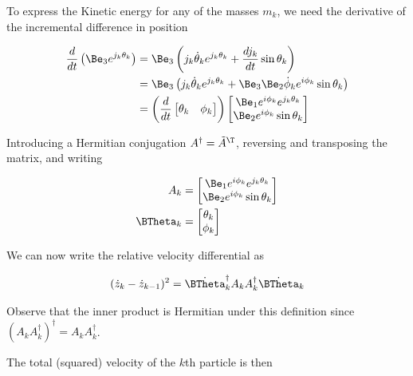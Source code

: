 To express the Kinetic energy for any of the masses $m_k$, we need the derivative of the incremental difference in position

\begin{align*}
\frac{d}{dt} \left( \Be_3 e^{j_k \theta_k} \right) 
&=
\Be_3 \left( j_k \dot{\theta}_k e^{j_k \theta_k} + \frac{d j_k }{dt} \sin\theta_k \right)  \\
&=
\Be_3 \left( j_k \dot{\theta}_k e^{j_k \theta_k} + \Be_3 \Be_2 \dot{\phi}_k e^{i \phi_k} \sin\theta_k \right)  \\
&=
\left( \frac{d}{dt}
\begin{bmatrix}
\theta_k & \phi_k
\end{bmatrix} \right) 
\begin{bmatrix}
\Be_1 e^{i \phi_k} e^{j_k \theta_k} \\
\Be_2 e^{i \phi_k} \sin\theta_k 
\end{bmatrix}
\end{align*}

Introducing a Hermitian conjugation $A^\dagger = \tilde{A}^\T$, reversing and transposing the matrix, and writing

\begin{align}\label{eqn:multiPendulumSpherical2:boo2}
A_k &=
\begin{bmatrix}
\Be_1 e^{i \phi_k} e^{j_k \theta_k} \\
\Be_2 e^{i \phi_k} \sin\theta_k 
\end{bmatrix} \\
\BTheta_k &=
\begin{bmatrix}
\theta_k \\
\phi_k
\end{bmatrix}
\end{align}

We can now write the relative velocity differential as

\begin{align}\label{eqn:multiPendulumSpherical2:boo3}
(\dot{z}_k - \dot{z}_{k-1})^2 = {\dot{\BTheta}_k}^\dagger A_k A_k^\dagger \dot{\BTheta}_k
\end{align}

Observe that the inner product is Hermitian under this definition since $(A_k A_k^\dagger)^\dagger = A_k A_k^\dagger$.

The total (squared) velocity of the $k$th particle is then

